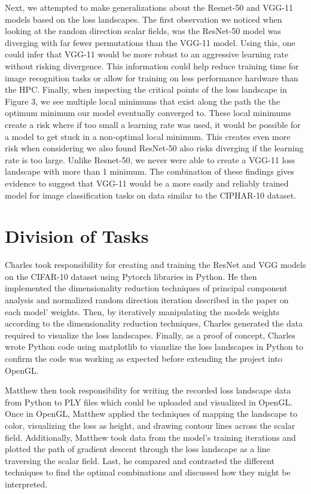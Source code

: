 \documentclass{acmsiggraph}
\begin{document}
Next, we attempted to make generalizations about the Resnet-50 and VGG-11 models based on the loss landscapes. The first observation we noticed when looking at the random direction scalar fields, was the ResNet-50 model was diverging with far fewer permutations than the VGG-11 model. Using this, one could infer that VGG-11 would be more robust to an aggressive learning rate without risking divergence. This information could help reduce training time for image recognition tasks or allow for training on less performance hardware than the HPC. Finally, when inspecting the critical points of the loss landscape in Figure 3, we see multiple local minimums that exist along the path the the optimum minimum our model eventually converged to. These local minimums create a risk where if too small a learning rate was used, it would be possible for a model to get stuck in a non-optimal local minimum. This creates even more risk when considering we also found ResNet-50 also risks diverging if the learning rate is too large. Unlike Resnet-50, we never were able to create a VGG-11 loss landscape with more than 1 minimum. The combination of these findings gives evidence to suggest that VGG-11 would be a more easily and reliably trained model for image classification tasks on data similar to the CIPHAR-10 dataset.

\section{Division of Tasks}
\label{sec:intro}

Charles took responsibility for creating and training the ResNet and VGG models on the CIFAR-10 dataset using Pytorch libraries in Python.
He then implemented the dimensionality reduction techniques of principal component analysis and normalized random direction iteration described in the paper on each model' weights. Then, by iteratively manipulating the models weights according to the dimensionality reduction techniques, Charles generated the data required to visualize the loss landscapes. Finally, as a proof of concept, Charles wrote Python code using matplotlib to viauzlize the loss landscapes in Python to confirm the code was working as expected before extending the project into OpenGL.

Matthew then took responsibility for writing the recorded loss landscape data from Python to PLY files which could be uploaded and visualized in OpenGL.
Once in OpenGL, Matthew applied the techniques of mapping the landscape to color, visualizing the loss as height, and drawing contour lines across the scalar field.
Additionally, Matthew took data from the model's training iterations and plotted the path of gradient descent through the loss landscape as a line traversing the scalar field. Last, he compared and contrasted the different techniques to find the optimal combinations and discussed how they might be interpreted.
\end{document}
